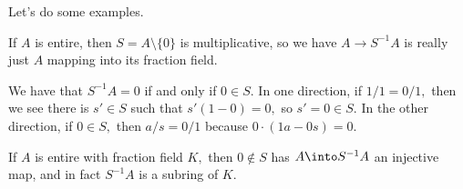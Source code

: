 \documentclass[../notes.tex]{subfiles}
\begin{document}
Let's do some examples.
\begin{example}
    If $A$ is entire, then $S=A\setminus\{0\}$ is multiplicative, so we have $A\to S^{-1}A$ is really just $A$ mapping into its fraction field.
\end{example}
\begin{example}
    We have that $S^{-1}A=0$ if and only if $0\in S.$ In one direction, if $1/1=0/1,$ then we see there is $s'\in S$ such that $s'(1-0)=0,$ so $s'=0\in S.$ In the other direction, if $0\in S,$ then $a/s=0/1$ because $0\cdot(1a-0s)=0.$
\end{example}
\begin{example}
    If $A$ is entire with fraction field $K,$ then $0\notin S$ has $A\into S^{-1}A$ an injective map, and in fact $S^{-1}A$ is a subring of $K.$
\end{example}
\end{document}
